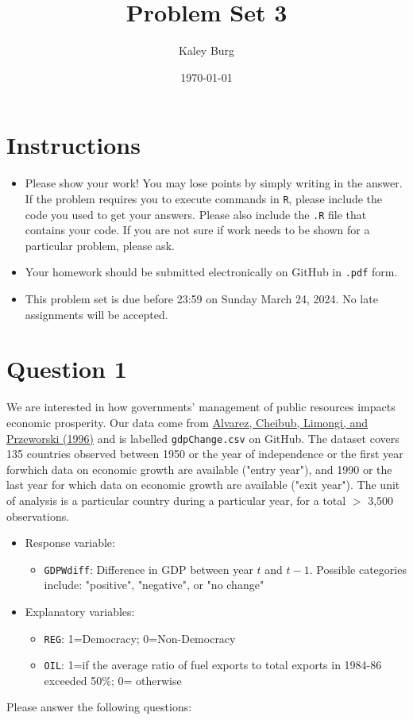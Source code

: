 \documentclass[12pt,letterpaper]{article}
\title{Problem Set 3}
\date{\today}
\author{Kaley Burg}
\begin{document}
	\maketitle
	\section*{Instructions}
	\begin{itemize}
	\item Please show your work! You may lose points by simply writing in the answer. If the problem requires you to execute commands in \texttt{R}, please include the code you used to get your answers. Please also include the \texttt{.R} file that contains your code. If you are not sure if work needs to be shown for a particular problem, please ask.
\item Your homework should be submitted electronically on GitHub in \texttt{.pdf} form.
\item This problem set is due before 23:59 on Sunday March 24, 2024. No late assignments will be accepted.
	\end{itemize}

	\vspace{.25cm}
\section*{Question 1}
\vspace{.25cm}
\noindent We are interested in how governments' management of public resources impacts economic prosperity. Our data come from \href{https://www.researchgate.net/profile/Adam_Przeworski/publication/240357392_Classifying_Political_Regimes/links/0deec532194849aefa000000/Classifying-Political-Regimes.pdf}{Alvarez, Cheibub, Limongi, and Przeworski (1996)} and is labelled \texttt{gdpChange.csv} on GitHub. The dataset covers 135 countries observed between 1950 or the year of independence or the first year forwhich data on economic growth are available ("entry year"), and 1990 or the last year for which data on economic growth are available ("exit year"). The unit of analysis is a particular country during a particular year, for a total $>$ 3,500 observations. 

\begin{itemize}
	\item
	Response variable: 
	\begin{itemize}
		\item \texttt{GDPWdiff}: Difference in GDP between year $t$ and $t-1$. Possible categories include: "positive", "negative", or "no change"
	\end{itemize}
	\item
	Explanatory variables: 
	\begin{itemize}
		\item
		\texttt{REG}: 1=Democracy; 0=Non-Democracy
		\item
		\texttt{OIL}: 1=if the average ratio of fuel exports to total exports in 1984-86 exceeded 50\%; 0= otherwise
	\end{itemize}
	
\end{itemize}
\newpage
\noindent Please answer the following questions:
\end{document}
